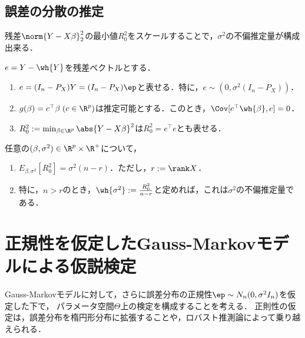 \documentclass[uplatex,dvipdfmx]{jsreport}
\begin{document}
\subsection{誤差の分散の推定}

\begin{tcolorbox}[colframe=ForestGreen, colback=ForestGreen!10!white,breakable,colbacktitle=ForestGreen!40!white,coltitle=black,fonttitle=\bfseries\sffamily,
title=]
    残差$\norm{Y-X\beta}_2^2$の最小値$R^2_0$をスケールすることで，$\sigma^2$の不偏推定量が構成出来る．
\end{tcolorbox}

\begin{proposition}
    $e=Y-\wh{Y}$を残差ベクトルとする．
    \begin{enumerate}
        \item $e=(I_n-P_X)Y=(I_n-P_X)\ep$と表せる．特に，$e\sim(0,\sigma^2(I_n-P_X))$．
        \item $g(\beta)=c^\top\beta\;(c\in\R^p)$は推定可能とする．このとき，$\Cov[c^\top\wh{\beta},e]=0$．
        \item $R^2_0:=\min_{\beta\in\R^p}\abs{Y-X\beta}^2$は$R^2_0=e^\top e$とも表せる．
    \end{enumerate}
\end{proposition}

\begin{theorem}[不偏推定量の構成]
    任意の$(\beta,\sigma^2)\in\R^p\times\R^+$について，
    \begin{enumerate}
        \item $E_{\beta,\sigma^2}[R^2_0]=\sigma^2(n-r)$．ただし，$r:=\rank X$．
        \item 特に，$n>r$のとき，$\wh{\sigma^2}:=\frac{R^2_0}{n-r}$と定めれば，これは$\sigma^2$の不偏推定量である．
    \end{enumerate}
\end{theorem}

\section{正規性を仮定したGauss-Markovモデルによる仮説検定}

\begin{tcolorbox}[colframe=ForestGreen, colback=ForestGreen!10!white,breakable,colbacktitle=ForestGreen!40!white,coltitle=black,fonttitle=\bfseries\sffamily,
title=]
    Gauss-Markovモデルに対して，さらに誤差分布の正規性$\ep\sim N_n(0,\sigma^2I_n)$を仮定した下で，
    パラメータ空間$\Theta$上の検定を構成することを考える．
    正則性の仮定は，誤差分布を楕円形分布に拡張することや，ロバスト推測論によって乗り越えられる．
\end{tcolorbox}
\end{document}
